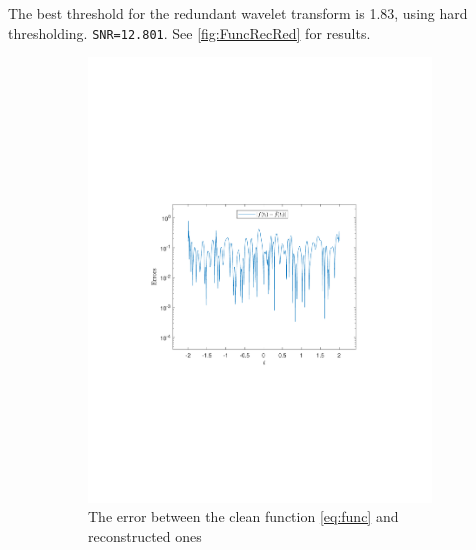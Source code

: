 \documentclass[a4paper]{article}
\begin{document}
	The best threshold for the redundant wavelet transform is 1.83, using hard thresholding. \texttt{SNR=12.801}. See \cref{fig:FuncRecRed} for results.
\begin{figure}[H]
	\centering
	\begin{subfigure}{0.49\textwidth}
		\centering
		\includegraphics[trim={4cm 8cm 4cm 8cm},clip,width=1\textwidth]{Images/FuncRecRedError.pdf}
		\caption{The error between the clean function \cref{eq:func} and reconstructed ones}
		\label{sub:FuncRecStdRed}
	\end{subfigure}
	\begin{subfigure}{0.49\textwidth}
		\centering

\end{subfigure}
\end{figure}
\end{document}
